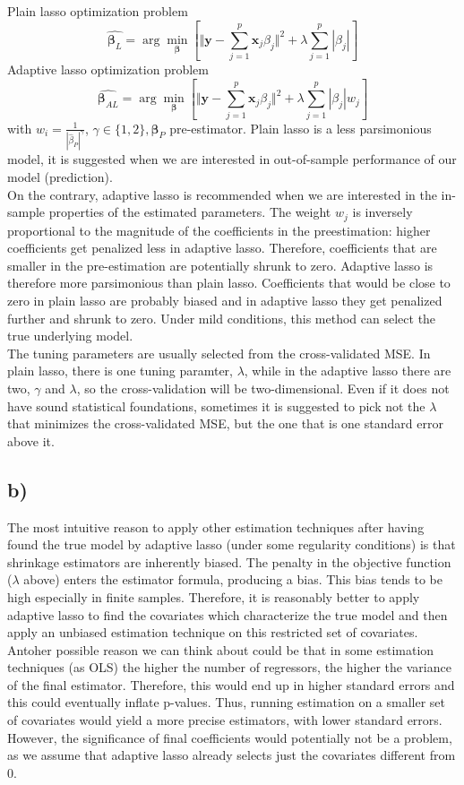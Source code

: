\documentclass[
]{article}
\begin{document}
Plain lasso optimization problem
\[  \hat{\bm \beta_{L}} =\arg\min_{\bm \beta}\left[ \Vert\bm y-\sum_{j=1}^{p} \bm x_j \beta_j \Vert^2 + \lambda\sum_{j=1}^{p}|\beta_j|\right]\]
Adaptive lasso optimization problem
\[  \hat{\bm \beta_{AL}} =\arg\min_{\bm \beta}\left[ \Vert\bm y-\sum_{j=1}^{p} \bm x_j \beta_j \Vert^2 + \lambda\sum_{j=1}^{p}|\beta_j|w_j\right]\]
with \(w_i=\frac{1}{|\hat\beta_P|^{\gamma}}\),
\(\gamma\in\{1,2\}, \bm\beta_P\) pre-estimator. Plain lasso is a less
parsimonious model, it is suggested when we are interested in
out-of-sample performance of our model (prediction).\\
On the contrary, adaptive lasso is recommended when we are interested in
the in-sample properties of the estimated parameters. The weight \(w_j\)
is inversely proportional to the magnitude of the coefficients in the
preestimation: higher coefficients get penalized less in adaptive lasso.
Therefore, coefficients that are smaller in the pre-estimation are
potentially shrunk to zero. Adaptive lasso is therefore more
parsimonious than plain lasso. Coefficients that would be close to zero
in plain lasso are probably biased and in adaptive lasso they get
penalized further and shrunk to zero. Under mild conditions, this method
can select the true underlying model.\\
The tuning parameters are usually selected from the cross-validated MSE.
In plain lasso, there is one tuning paramter, \(\lambda\), while in the
adaptive lasso there are two, \(\gamma\) and \(\lambda\), so the
cross-validation will be two-dimensional. Even if it does not have sound
statistical foundations, sometimes it is suggested to pick not the
\(\lambda\) that minimizes the cross-validated MSE, but the one that is
one standard error above it.

\hypertarget{b}{%
\subsection{b)}\label{b}}

The most intuitive reason to apply other estimation techniques after
having found the true model by adaptive lasso (under some regularity
conditions) is that shrinkage estimators are inherently biased. The
penalty in the objective function (\(\lambda\) above) enters the
estimator formula, producing a bias. This bias tends to be high
especially in finite samples. Therefore, it is reasonably better to
apply adaptive lasso to find the covariates which characterize the true
model and then apply an unbiased estimation technique on this restricted
set of covariates.\\
Antoher possible reason we can think about could be that in some
estimation techniques (as OLS) the higher the number of regressors, the
higher the variance of the final estimator. Therefore, this would end up
in higher standard errors and this could eventually inflate p-values.
Thus, running estimation on a smaller set of covariates would yield a
more precise estimators, with lower standard errors. However, the
significance of final coefficients would potentially not be a problem,
as we assume that adaptive lasso already selects just the covariates
different from 0.
\end{document}
